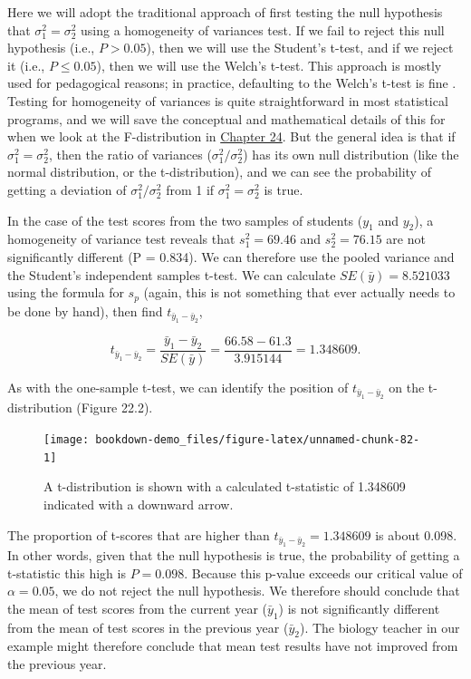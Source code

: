 \documentclass[
  openany]{krantz}
\begin{document}
Here we will adopt the traditional approach of first testing the null hypothesis that \(\sigma^{2}_{1} = \sigma^{2}_{2}\) using a homogeneity of variances test.
If we fail to reject this null hypothesis (i.e., \(P > 0.05\)), then we will use the Student's t-test, and if we reject it (i.e., \(P \leq 0.05\)), then we will use the Welch's t-test.
This approach is mostly used for pedagogical reasons; in practice, defaulting to the Welch's t-test is fine \citep{Ruxton2006, Delacre2017}.
Testing for homogeneity of variances is quite straightforward in most statistical programs, and we will save the conceptual and mathematical details of this for when we look at the F-distribution in \protect\hyperlink{Chapter_24}{Chapter 24}.
But the general idea is that if \(\sigma^{2}_{1} = \sigma^{2}_{2}\), then the ratio of variances (\(\sigma^{2}_{1}/\sigma^{2}_{2}\)) has its own null distribution (like the normal distribution, or the t-distribution), and we can see the probability of getting a deviation of \(\sigma^{2}_{1}/\sigma^{2}_{2}\) from 1 if \(\sigma^{2}_{1} = \sigma^{2}_{2}\) is true.

In the case of the test scores from the two samples of students (\(y_{1}\) and \(y_{2}\)), a homogeneity of variance test reveals that \(s^{2}_{1} = 69.46\) and \(s^{2}_{2} = 76.15\) are not significantly different (P = 0.834).
We can therefore use the pooled variance and the Student's independent samples t-test.
We can calculate \(SE(\bar{y}) = 8.521033\) using the formula for \(s_{p}\) (again, this is not something that ever actually needs to be done by hand), then find \(t_{\bar{y}_{1} - \bar{y}_{2}}\),

\[t_{\bar{y}_{1} - \bar{y}_{2}} = \frac{\bar{y}_{1} - \bar{y}_{2}}{SE(\bar{y})} = \frac{66.58 - 61.3}{3.915144} = 1.348609.\]

As with the one-sample t-test, we can identify the position of \(t_{\bar{y}_{1} - \bar{y}_{2}}\) on the t-distribution (Figure 22.2).

\begin{figure}
\texttt{[image: bookdown-demo\_files/figure-latex/unnamed-chunk-82-1]} \caption{A t-distribution is shown with a calculated t-statistic of 1.348609 indicated with a downward arrow.}\label{fig:unnamed-chunk-82}
\end{figure}

The proportion of t-scores that are higher than \(t_{\bar{y}_{1} - \bar{y}_{2}} = 1.348609\) is about 0.098.
In other words, given that the null hypothesis is true, the probability of getting a t-statistic this high is \(P = 0.098\).
Because this p-value exceeds our critical value of \(\alpha = 0.05\), we do not reject the null hypothesis.
We therefore should conclude that the mean of test scores from the current year (\(\bar{y}_{1}\)) is not significantly different from the mean of test scores in the previous year (\(\bar{y}_{2}\)).
The biology teacher in our example might therefore conclude that mean test results have not improved from the previous year.
\end{document}
